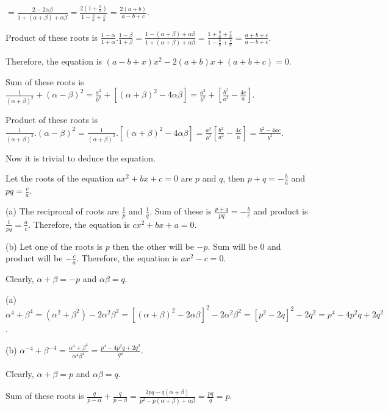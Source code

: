     $= \frac{2 - 2\alpha\beta}{1 + (\alpha + \beta) + \alpha\beta} = \frac{2\left(1 +
    \frac{b}{a}\right)}{1 - \frac{b}{a} + \frac{c}{a}} = \frac{2(a + b)}{a - b + c}$.

    Product of these roots is $\frac{1 - \alpha}{1 + \alpha}.\frac{1 - \beta}{1 + \beta} = \frac{1
      -(\alpha + \beta) + \alpha\beta}{1 + (\alpha + \beta) + \alpha\beta} = \frac{1 + \frac{b}{a} +
      \frac{c}{a}}{1 - \frac{b}{a} + \frac{c}{a}} = \frac{a + b + c}{a - b + c}$.

    Therefore, the equation is $(a - b + x)x^2 - 2(a + b)x + (a + b + c) = 0$.
  \item Sum of these roots is $\frac{1}{(\alpha + \beta)^2} + (\alpha - \beta)^2 = \frac{a^2}{b^2} +
    [(\alpha + \beta)^2 - 4\alpha\beta] = \frac{a^2}{b^2} + \left[\frac{b^2}{a^2} - \frac{4c}{a}\right]$.

    Product of these roots is $\frac{1}{(\alpha + \beta)^2}.(\alpha - \beta)^2 = \frac{1}{(\alpha +
      \beta)^2}.[(\alpha + \beta)^2 - 4\alpha\beta] = \frac{a^2}{b^2}\left[\frac{b^2}{a^2} -
      \frac{4c}{a}\right] = \frac{b^2 - 4ac}{b^2}$.

    Now it is trivial to deduce the equation.
  \stopitemize
\item Let the roots of the equation $ax^2 + bx + c = 0$ are $p$ and $q$, then $p + q = -\frac{b}{a}$ and $pq
  = \frac{c}{a}$.

  (a) The reciprocal of roots are $\frac{1}{p}$ and $\frac{1}{q}$. Sum of these is $\frac{p + q}{pq} =
  -\frac{b}{c}$ and product is $\frac{1}{pq} = \frac{a}{c}$. Therefore, the equation is $cx^2 + bx + a = 0$.

  (b) Let one of the roots is $p$ then the other will be $-p$. Sum will be $0$ and product will be
  $-\frac{c}{a}$. Therefore, the equation is $ax^2 - c = 0$.
\item Clearly, $\alpha + \beta = -p$ and $\alpha\beta = q$.

  (a) $\alpha^4 + \beta^4 = (\alpha^2 + \beta^2) - 2\alpha^2\beta^2 = [(\alpha + \beta)^2 - 2\alpha\beta]^2
  - 2\alpha^2\beta^2 = [p^2 - 2q]^2 - 2q^2 = p^4 - 4p^2q + 2q^2$.

  (b) $\alpha^{-4} + \beta^{-4} = \frac{\alpha^4 + \beta^4}{\alpha^4\beta^4} = \frac{p^4 - 4p^2q +
    2q^2}{q^4}$.
\item Clearly, $\alpha + \beta = p$ and $\alpha\beta = q$.
  \startitemize[i]
  \item Sum of these roots is $\frac{q}{p - \alpha} + \frac{q}{p - \beta} = \frac{2pq - q(\alpha +
    \beta)}{p^2 - p(\alpha + \beta) + \alpha\beta} = \frac{pq}{q} = p$.

